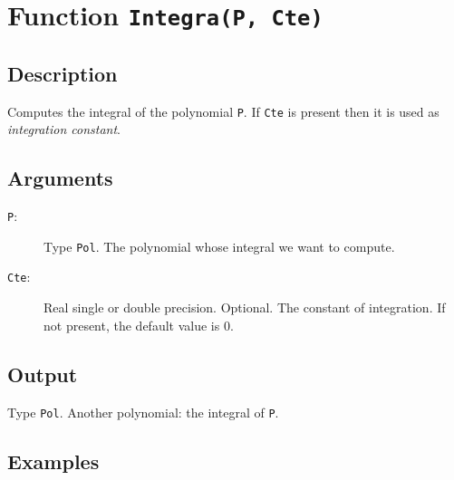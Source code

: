 \section{Function \texttt{Integra(P, Cte)}}

\subsection{Description}

Computes the integral of the polynomial \texttt{P}. If \texttt{Cte} is
present then it is used as \emph{integration constant}.

\subsection{Arguments}

\begin{description}
\item[\texttt{P}:] Type \texttt{Pol}. The polynomial whose integral
  we want to compute.
\item[\texttt{Cte}:] Real single or double precision. Optional. The
  constant of integration. If not present, the default value is 0.
\end{description}

\subsection{Output}

Type \texttt{Pol}. Another polynomial: the integral of \texttt{P}.

\subsection{Examples}

